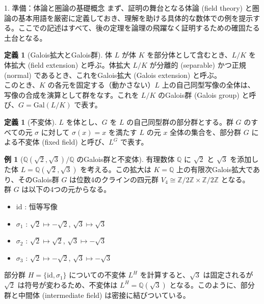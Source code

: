 \documentclass[10pt, unicode]{beamer}
\theoremstyle{definition}
\newtheorem{defn}[thm]{定義}
\newtheorem{exa}[thm]{例}
\begin{document}
\begin{frame}[allowframebreaks]{1. 準備：体論と圏論の基礎概念}
    まず、証明の舞台となる体論 (field theory) と圏論の基本用語を厳密に定義しておき、理解を助ける具体的な数体での例を提示する。ここでの記述はすべて、後の定理を論理の飛躍なく証明するための確固たる土台となる。

    \begin{defn}[Galois拡大とGalois群]
        体 $L$ が体 $K$ を部分体として含むとき、$L/K$ を体拡大 (field extension) と呼ぶ。体拡大 $L/K$ が分離的 (separable) かつ正規 (normal) であるとき、これをGalois拡大 (Galois extension) と呼ぶ。\\
        このとき、$K$ の各元を固定する（動かさない）$L$ 上の自己同型写像の全体は、写像の合成を演算として群をなす。これを $L/K$ のGalois群 (Galois group) と呼び、$G = \mathrm{Gal}(L/K)$ で表す。
    \end{defn}

    \begin{defn}[不変体]
        $L$ を体とし、$G$ を $L$ の自己同型群の部分群とする。群 $G$ のすべての元 $\sigma$ に対して $\sigma(x) = x$ を満たす $L$ の元 $x$ 全体の集合を、部分群 $G$ による不変体 (fixed field) と呼び、$L^G$ で表す。
    \end{defn}

    \begin{exa}[$\mathbb{Q}(\sqrt{2}, \sqrt{3}) / \mathbb{Q}$ のGalois群と不変体]
        有理数体 $\mathbb{Q}$ に $\sqrt{2}$ と $\sqrt{3}$ を添加した体 $L = \mathbb{Q}(\sqrt{2}, \sqrt{3})$ を考える。この拡大は $K = \mathbb{Q}$ 上の有限次Galois拡大であり、そのGalois群 $G$ は位数4のクラインの四元群 $V_4 \cong \mathbb{Z}/2\mathbb{Z} \times \mathbb{Z}/2\mathbb{Z}$ となる。\\
        群 $G$ は以下の4つの元からなる。
        \begin{itemize}
            \item $\mathrm{id}$ : 恒等写像
            \item $\sigma_1$ : $\sqrt{2} \mapsto -\sqrt{2}$, $\sqrt{3} \mapsto \sqrt{3}$
            \item $\sigma_2$ : $\sqrt{2} \mapsto \sqrt{2}$, $\sqrt{3} \mapsto -\sqrt{3}$
            \item $\sigma_3$ : $\sqrt{2} \mapsto -\sqrt{2}$, $\sqrt{3} \mapsto -\sqrt{3}$
        \end{itemize}
        部分群 $H = \{ \mathrm{id}, \sigma_1 \}$ についての不変体 $L^H$ を計算すると、$\sqrt{3}$ は固定されるが $\sqrt{2}$ は符号が変わるため、不変体は $L^H = \mathbb{Q}(\sqrt{3})$ となる。このように、部分群と中間体 (intermediate field) は密接に結びついている。
    \end{exa}
\end{frame}
\end{document}
